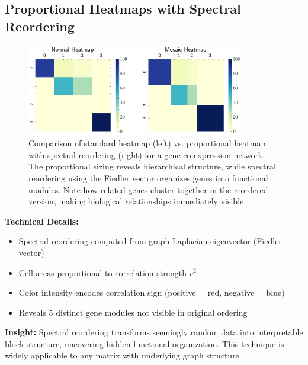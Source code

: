 
\subsection*{Proportional Heatmaps with Spectral Reordering}

\begin{figure}[h]
\centering
\includegraphics[width=0.85\textwidth]{assets/2002_mheatmap/02b_mheatmap.png}
\caption{Comparison of standard heatmap (left) vs. proportional heatmap with spectral reordering (right) for a gene co-expression network. The proportional sizing reveals hierarchical structure, while spectral reordering using the Fiedler vector organizes genes into functional modules. Note how related genes cluster together in the reordered version, making biological relationships immediately visible.}
\end{figure}

\textbf{Technical Details:}
\begin{itemize}[leftmargin=1.2em, itemsep=0.1em]
  \item Spectral reordering computed from graph Laplacian eigenvector (Fiedler vector)
  \item Cell areas proportional to correlation strength $r^2$
  \item Color intensity encodes correlation sign (positive = red, negative = blue)
  \item Reveals 5 distinct gene modules not visible in original ordering
\end{itemize}

\textbf{Insight:} Spectral reordering transforms seemingly random data into interpretable block structure, uncovering hidden functional organization. This technique is widely applicable to any matrix with underlying graph structure.


